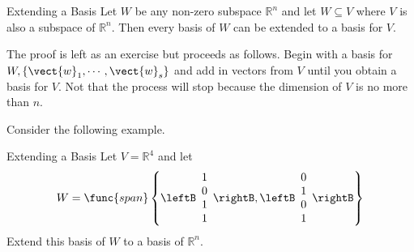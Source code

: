 \begin{theorem}{Extending a Basis}\label{thm:extendingbasis}
Let $W$ be any non-zero subspace $\mathbb{R}^{n}$ and let $W\subseteq V$
where $V$ is also a subspace of $\mathbb{R}^{n}$. Then every basis of $W$
can be extended to a basis for $V$.
\end{theorem}

The proof is left as an exercise but proceeds as follows. Begin with a basis for $W,\left\{ \vect{w}_{1},\cdots ,\vect{w}_{s}\right\} $ and add in vectors from $V$ until you obtain a basis for $V$.
Not that the process will stop because the dimension of $V$ is no more than $n$. 

Consider the following example.

\begin{example}{Extending a Basis}\label{exa:extendingbasis}
Let $V=\mathbb{R}^{4}$ and let 
\begin{equation*}
W=\func{span}\left\{ \leftB
\begin{array}{c}
1 \\ 
0 \\ 
1 \\ 
1
\end{array}
\rightB ,\leftB 
\begin{array}{c}
0 \\ 
1 \\ 
0 \\ 
1
\end{array}
\rightB \right\}
\end{equation*}
Extend this basis of $W$ to a basis of $\mathbb{R}^{n}$.
\end{example}

